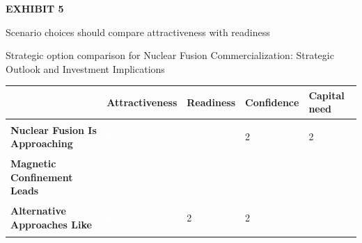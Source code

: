\documentclass[10pt,a4paper]{article}
\begin{document}
\clearpage
{\textcolor{BOGreen}{\scriptsize\bfseries EXHIBIT 5}}\par\vspace{4pt}
{\sffamily\fontsize{17}{21}\selectfont\color{BONavy} Scenario choices should compare attractiveness with readiness}\par
{\small\color{BOText} Strategic option comparison for Nuclear Fusion Commercialization: Strategic Outlook and Investment Implications}\par\vspace{6pt}
{\scriptsize\begin{tabular}{p{38mm}>{\centering\arraybackslash}p{21mm}>{\centering\arraybackslash}p{21mm}>{\centering\arraybackslash}p{21mm}>{\centering\arraybackslash}p{21mm}}
 & {\bfseries Attractiveness} & {\bfseries Readiness} & {\bfseries Confidence} & {\bfseries Capital need} \\
\hline
{\bfseries Nuclear Fusion Is Approaching} & \colorbox{BOGreen}{\textcolor{white}{\strut\hspace{5pt}5\hspace{5pt}}} & \colorbox{BOBlue}{\textcolor{white}{\strut\hspace{5pt}3\hspace{5pt}}} & \colorbox{BOLight}{\textcolor{BOText}{\strut\hspace{5pt}2\hspace{5pt}}} & \colorbox{BOLight}{\textcolor{BOText}{\strut\hspace{5pt}2\hspace{5pt}}} \\
{\bfseries Magnetic Confinement Leads} & \colorbox{BOGreen}{\textcolor{white}{\strut\hspace{5pt}4\hspace{5pt}}} & \colorbox{BOGreen}{\textcolor{white}{\strut\hspace{5pt}4\hspace{5pt}}} & \colorbox{BOBlue}{\textcolor{white}{\strut\hspace{5pt}3\hspace{5pt}}} & \colorbox{BOBlue}{\textcolor{white}{\strut\hspace{5pt}3\hspace{5pt}}} \\
{\bfseries Alternative Approaches Like} & \colorbox{BOGreen}{\textcolor{white}{\strut\hspace{5pt}4\hspace{5pt}}} & \colorbox{BOLight}{\textcolor{BOText}{\strut\hspace{5pt}2\hspace{5pt}}} & \colorbox{BOLight}{\textcolor{BOText}{\strut\hspace{5pt}2\hspace{5pt}}} & \colorbox{BOGreen}{\textcolor{white}{\strut\hspace{5pt}4\hspace{5pt}}} \\

\end{tabular}}
\end{document}
